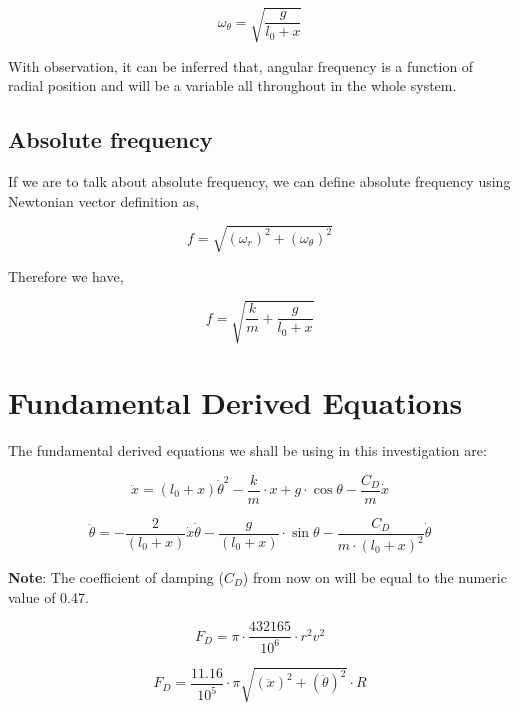             $$\omega_\theta = \sqrt{\frac{g}{l_0 + x}}$$
                
        {With observation, it can be inferred that, angular frequency is a function of radial position and will be a variable all throughout in the whole system.}
                
    \subsection{{Absolute frequency}}
                
        {If we are to talk about absolute frequency, we can define absolute frequency using Newtonian vector definition as,}
                
            $$f = \sqrt{\left(\omega_r\right)^2 + \left(\omega_\theta\right)^2}$$
                
        {Therefore we have,}
                
            $$f = \sqrt{\frac{k}{m} + \frac{g}{l_0 + x}}$$



\section{{Fundamental Derived Equations}}
{The fundamental derived equations we shall be using in this investigation are:}
            
    \begin{equation}
        \ddot{x} = (l_0+x)\dot{\theta}^2 - \frac{k}{m}\cdot x + g\cdot\cos{\theta} - \frac{C_D}{m}\dot{x}
        \label{eq1}
    \end{equation}
            
    \begin{equation}
        \ddot{\theta} = - \frac{2}{(l_0+x)}\dot{x}\dot{\theta} - \frac{g}{(l_0+x)}\cdot\sin{\theta} - \frac{C_D}{m\cdot(l_0+x)^2}\dot{\theta}
    \label{eq2}
    \end{equation}
            
        {\textbf{Note}: The coefficient of damping ($C_D$) from now on will be equal to the numeric value of 0.47.}
            
    \begin{equation}
        F_D = \pi\cdot\frac{432165}{10^{6}}\cdot r^2v^2
        \label{eq3}
    \end{equation}
            
    \begin{equation}
        F_D = \frac{11.16}{10^{5}}\cdot\pi\sqrt{(\ddot{x})^2 + (\ddot{\theta})^2}\cdot R
        \label{eq4}
    \end{equation}
            
